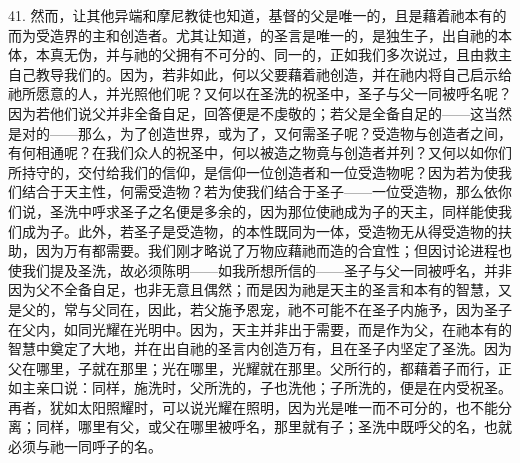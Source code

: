 41. 然而，让其他异端和摩尼教徒也知道，基督的父是唯一的，且是藉着祂本有的而为受造界的主和创造者。尤其让知道，的圣言是唯一的，是独生子，出自祂的本体，本真无伪，并与祂的父拥有不可分的、同一的，正如我们多次说过，且由救主自己教导我们的。因为，若非如此，何以父要藉着祂创造，并在祂内将自己启示给祂所愿意的人，并光照他们呢？又何以在圣洗的祝圣中，圣子与父一同被呼名呢？因为若他们说父并非全备自足，回答便是不虔敬的；若父是全备自足的——这当然是对的——那么，为了创造世界，或为了，又何需圣子呢？受造物与创造者之间，有何相通呢？在我们众人的祝圣中，何以被造之物竟与创造者并列？又何以如你们所持守的，交付给我们的信仰，是信仰一位创造者和一位受造物呢？因为若为使我们结合于天主性，何需受造物？若为使我们结合于圣子——一位受造物，那么依你们说，圣洗中呼求圣子之名便是多余的，因为那位使祂成为子的天主，同样能使我们成为子。此外，若圣子是受造物，的本性既同为一体，受造物无从得受造物的扶助，因为万有都需要。我们刚才略说了万物应藉祂而造的合宜性；但因讨论进程也使我们提及圣洗，故必须陈明——如我所想所信的——圣子与父一同被呼名，并非因为父不全备自足，也非无意且偶然；而是因为祂是天主的圣言和本有的智慧，又是父的，常与父同在，因此，若父施予恩宠，祂不可能不在圣子内施予，因为圣子在父内，如同光耀在光明中。因为，天主并非出于需要，而是作为父，在祂本有的智慧中奠定了大地，并在出自祂的圣言内创造万有，且在圣子内坚定了圣洗。因为父在哪里，子就在那里；光在哪里，光耀就在那里。父所行的，都藉着子而行，正如主亲口说：同样，施洗时，父所洗的，子也洗他；子所洗的，便是在内受祝圣。再者，犹如太阳照耀时，可以说光耀在照明，因为光是唯一而不可分的，也不能分离；同样，哪里有父，或父在哪里被呼名，那里就有子；圣洗中既呼父的名，也就必须与祂一同呼子的名。\par

